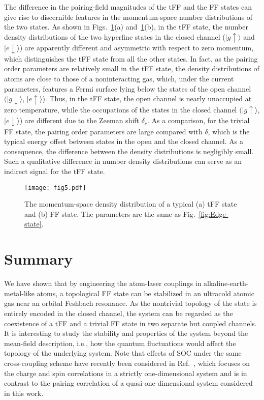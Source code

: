 \documentclass[a4paper, aps,pra, twocolumn, superscriptaddress, showpacs]{revtex4}
\begin{document}
\label{sec:tof}
The difference in the pairing-field magnitudes of the tFF and the FF states can give rise to discernible features in the momentum-space number distributions of the two states. As shown in Figs.~\ref{fig:Particle-number}(a) and~\ref{fig:Particle-number}(b), in the tFF state, the number density distributions of the two hyperfine states in the closed channel ($|g\uparrow\rangle$ and $|e\downarrow\rangle$) are apparently different and asymmetric with respect to zero momentum, which distinguishes the tFF state from all the other states. In fact, as the pairing order parameters are relatively small in the tFF state, the density distributions of atoms are close to those of a noninteracting gas, which, under the current parameters, features a Fermi surface lying below the states of the open channel $(|g\downarrow\rangle$, $|e\uparrow\rangle$). Thus, in the tFF state, the open channel is nearly unoccupied at zero temperature, while the occupations of the states in the closed channel $(|g\uparrow\rangle$, $|e\downarrow\rangle$) are different due to the Zeeman shift $\delta_c$. As a comparison, for the trivial FF state, the pairing order parameters are large compared with $\delta$, which is the typical energy offset between states in the open and the closed channel. As a consequence, the difference between the density distributions is negligibly small. Such a qualitative difference in number density distributions can serve as an indirect signal for the tFF state.

\begin{figure}[tbp]
\texttt{[image: fig5.pdf]}
\caption{\label{fig:Particle-number}The momentum-space density
distribution of a typical (a) tFF state and (b) FF state. The parameters are the same as Fig.~\ref{fig:Edge-state}.}
\end{figure}



\section{Summary}
\label{sec:summary}
We have shown that by engineering the atom-laser couplings in alkaline-earth-metal-like atoms, a topological FF state can be stabilized in an ultracold atomic gas near an orbital Feshbach resonance. As the nontrivial topology of the state is entirely encoded in the closed channel, the system can be regarded as the coexistence of a tFF and a trivial FF state in two separate but coupled channels. It is interesting to study the stability and properties of the system beyond the mean-field description, i.e., how the quantum fluctuations would affect the topology of the underlying system. Note that effects of SOC under the same cross-coupling scheme have recently been considered in Ref.~\cite{iemini_majorana_2017}, which focuses on the charge and spin correlations in a strictly one-dimensional system and is in contrast to the pairing correlation of a quasi-one-dimensional system considered in this work.
\end{document}
